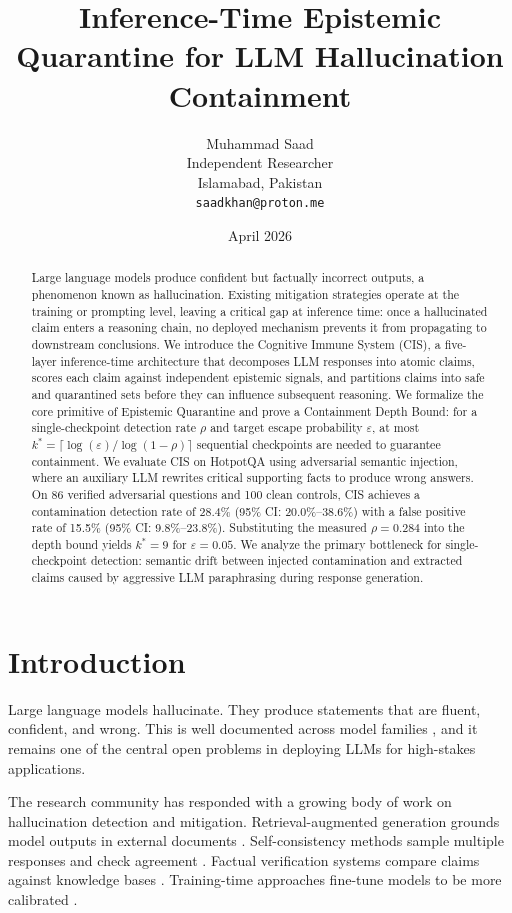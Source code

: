 \documentclass[11pt,a4paper]{article}
\title{Inference-Time Epistemic Quarantine for LLM Hallucination Containment}
\author{
Muhammad Saad \\
Independent Researcher \\
Islamabad, Pakistan \\
\texttt{saadkhan@proton.me}
}
\date{April 2026}
\begin{document}
\maketitle

\begin{abstract}
Large language models produce confident but factually incorrect outputs, a phenomenon known as hallucination. Existing mitigation strategies operate at the training or prompting level, leaving a critical gap at inference time: once a hallucinated claim enters a reasoning chain, no deployed mechanism prevents it from propagating to downstream conclusions. We introduce the Cognitive Immune System (CIS), a five-layer inference-time architecture that decomposes LLM responses into atomic claims, scores each claim against independent epistemic signals, and partitions claims into safe and quarantined sets before they can influence subsequent reasoning. We formalize the core primitive of Epistemic Quarantine and prove a Containment Depth Bound: for a single-checkpoint detection rate $\rho$ and target escape probability $\varepsilon$, at most $k^* = \lceil \log(\varepsilon) / \log(1-\rho) \rceil$ sequential checkpoints are needed to guarantee containment. We evaluate CIS on HotpotQA using adversarial semantic injection, where an auxiliary LLM rewrites critical supporting facts to produce wrong answers. On 86 verified adversarial questions and 100 clean controls, CIS achieves a contamination detection rate of 28.4\% (95\% CI: 20.0\%--38.6\%) with a false positive rate of 15.5\% (95\% CI: 9.8\%--23.8\%). Substituting the measured $\rho=0.284$ into the depth bound yields $k^*=9$ for $\varepsilon=0.05$. We analyze the primary bottleneck for single-checkpoint detection: semantic drift between injected contamination and extracted claims caused by aggressive LLM paraphrasing during response generation.
\end{abstract}

\section{Introduction}

Large language models hallucinate. They produce statements that are fluent, confident, and wrong. This is well documented across model families \citep{ji2023survey, huang2023survey, zhang2023siren}, and it remains one of the central open problems in deploying LLMs for high-stakes applications.

The research community has responded with a growing body of work on hallucination detection and mitigation. Retrieval-augmented generation grounds model outputs in external documents \citep{lewis2020retrieval}. Self-consistency methods sample multiple responses and check agreement \citep{wang2023selfconsistency}. Factual verification systems compare claims against knowledge bases \citep{min2023factscore}. Training-time approaches fine-tune models to be more calibrated \citep{kadavath2022language}.
\end{document}
